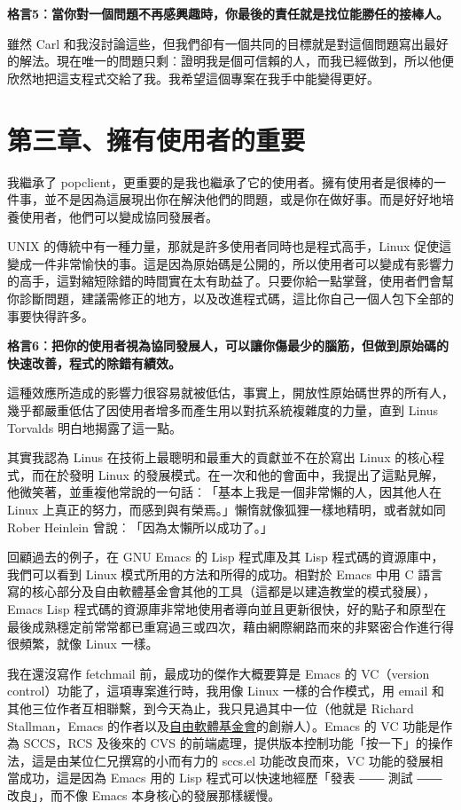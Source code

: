 \documentclass[12pt, a5paper]{book}
\begin{document}
\textbf{格言5︰當你對一個問題不再感興趣時，你最後的責任就是找位能勝任的接棒人。}

雖然 Carl
和我沒討論這些，但我們卻有一個共同的目標就是對這個問題寫出最好的解法。現在唯一的問題只剩︰證明我是個可信賴的人，而我已經做到，所以他便欣然地把這支程式交給了我。我希望這個專案在我手中能變得更好。

\newpage
\section{第三章、擁有使用者的重要}\label{ux7b2cux4e09ux7ae0ux64c1ux6709ux4f7fux7528ux8005ux7684ux91cdux8981}

我繼承了
popclient，更重要的是我也繼承了它的使用者。擁有使用者是很棒的一件事，並不是因為這展現出你在解決他們的問題，或是你在做好事。而是好好地培養使用者，他們可以變成協同發展者。

UNIX 的傳統中有一種力量，那就是許多使用者同時也是程式高手，Linux
促使這變成一件非常愉快的事。這是因為原始碼是公開的，所以使用者可以變成有影響力的高手，這對縮短除錯的時間實在太有助益了。只要你給一點掌聲，使用者們會幫你診斷問題，建議需修正的地方，以及改進程式碼，這比你自己一個人包下全部的事要快得許多。

\textbf{格言6︰把你的使用者視為協同發展人，可以讓你傷最少的腦筋，但做到原始碼的快速改善，程式的除錯有績效。}

這種效應所造成的影響力很容易就被低估，事實上，開放性原始碼世界的所有人，幾乎都嚴重低估了因使用者增多而產生用以對抗系統複雜度的力量，直到
Linus Torvalds 明白地揭露了這一點。

其實我認為 Linus 在技術上最聰明和最重大的貢獻並不在於寫出 Linux
的核心程式，而在於發明 Linux
的發展模式。在一次和他的會面中，我提出了這點見解，他微笑著，並重複他常說的一句話︰「基本上我是一個非常懶的人，因其他人在
Linux 上真正的努力，而感到與有榮焉。」懶惰就像狐狸一樣地精明，或者就如同
Rober Heinlein 曾說︰「因為太懶所以成功了。」

回顧過去的例子，在 GNU Emacs 的 Lisp 程式庫及其 Lisp
程式碼的資源庫中，我們可以看到 Linux 模式所用的方法和所得的成功。相對於
Emacs 中用 C
語言寫的核心部分及自由軟體基金會其他的工具（這都是以建造教堂的模式發展），Emacs
Lisp
程式碼的資源庫非常地使用者導向並且更新很快，好的點子和原型在最後成熟穩定前常常都已重寫過三或四次，藉由網際網路而來的非緊密合作進行得很頻繁，就像
Linux 一樣。

我在還沒寫作 fetchmail 前，最成功的傑作大概要算是 Emacs 的 VC（version
control）功能了，這項專案進行時，我用像 Linux 一樣的合作模式，用 email
和其他三位作者互相聯繫，到今天為止，我只見過其中一位（他就是 Richard
Stallman，Emacs
的作者以及\href{http://www.fsf.org}{自由軟體基金會}的創辦人）。Emacs 的
VC 功能是作為 SCCS，RCS 及後來的 CVS
的前端處理，提供版本控制功能「按一下」的操作法，這是由某位仁兄撰寫的小而有力的
sccs.el 功能改良而來，VC 功能的發展相當成功，這是因為 Emacs 用的 Lisp
程式可以快速地經歷「發表 ―― 測試 ―― 改良」，而不像 Emacs
本身核心的發展那樣緩慢。
\end{document}
